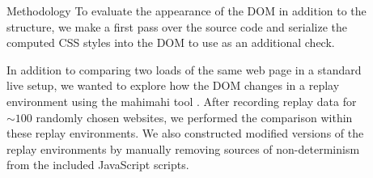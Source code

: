 \documentclass[final]{beamer}
\newlength{\sepwid}
\newlength{\onecolwid}
\begin{document}
\begin{frame}[t]
\begin{columns}[t]
\begin{column}{\onecolwid}
\vspace{-0.5cm}
\begin{block}{Methodology}
To evaluate the appearance of the DOM in addition to the structure, we make a first pass over the source code and serialize the computed CSS styles into the DOM to use as an additional check. 

In addition to comparing two loads of the same web page in a standard live setup, we wanted to explore how the DOM changes in a replay environment using the mahimahi tool \cite{netravali_sivaraman_winstein_das_goyal_balakrishnan_2014}. After recording replay data for $\sim 100$ randomly chosen websites, we performed the comparison within these replay environments. We also constructed modified versions of the replay environments by manually removing sources of non-determinism from the included JavaScript scripts. 
\end{block}


\end{column} %

\begin{column}{\sepwid}\end{column} %

\begin{column}{\onecolwid} %





\end{column}
\end{columns}
\end{frame}
\end{document}
